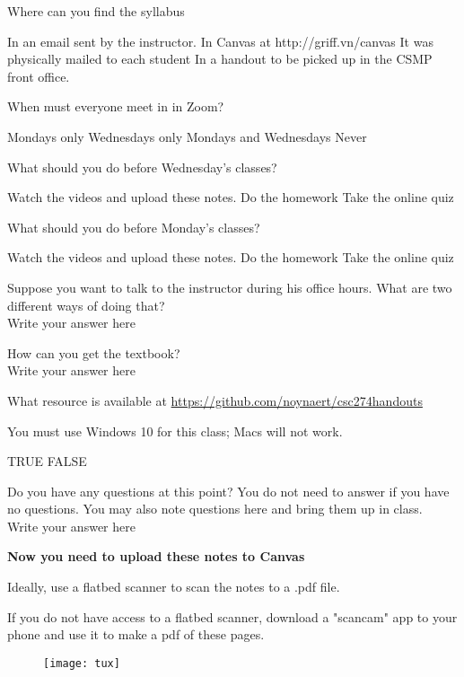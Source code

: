 \documentclass[letterpaper,12pt]{exam}
\begin{document}
\begin{questions}
	\question Where can you find the syllabus
	\begin{checkboxes}
	\choice In an email sent by the instructor.
	\choice In Canvas at http://griff.vn/canvas
	\choice It was physically mailed to each student
	\choice In a handout to be picked up in the CSMP front office.
	\end{checkboxes}

	\question When must everyone meet in in Zoom?
	\begin{checkboxes}
	\choice Mondays only
	\choice Wednesdays only
	\choice Mondays and Wednesdays
	\choice Never
	\end{checkboxes}

	\question What should you do before Wednesday's classes?
	\begin{checkboxes}
	\choice Watch the videos and upload these notes.
	\choice Do the homework
	\choice Take the online quiz
	\end{checkboxes}
	\question What should you do before Monday's classes?
	\begin{checkboxes}
	\choice Watch the videos and upload these notes.
	\choice Do the homework
	\choice Take the online quiz
	\end{checkboxes}

	\question Suppose you want to talk to the instructor during his office hours.  What are two different ways of doing that?
	\\{\color{blue} Write your answer here }
	\vspace{1cm}

	\question How can you get the textbook? 
	\\{\color{blue} Write your answer here }
	\vspace{1cm}

	\question What resource is available at  \url{https://github.com/noynaert/csc274handouts}
	\vspace{1cm}

	\question You must use Windows 10 for this class; Macs will not work.
	\begin{checkboxes}
	\choice TRUE
	\choice FALSE

	\end{checkboxes}

	\question Do you have any questions at this point?  You do not need to answer if you have no questions.  You may also note questions here and bring them up in class. 
	\\{\color{blue} Write your answer here }


\end{questions}
\vspace{1cm}
\begin{center}
	\textbf{Now you need to upload these notes to Canvas}

	Ideally, use a flatbed scanner to scan the notes to a .pdf file.

	If you do not have access to a flatbed scanner, download a "scancam" app to your phone and use it to make a pdf of these pages.
\end{center}
\vspace{1cm}

\begin{figure}[b]\label{end}
	\center
	\texttt{[image: tux]}
	{}
\end{figure}
\end{document}
